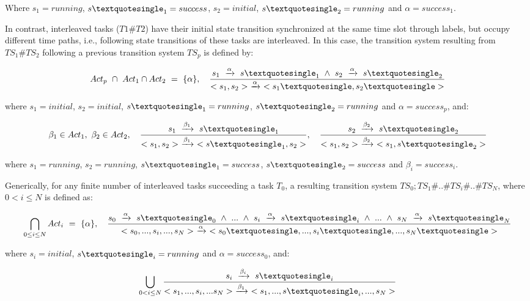 Where $s_1 = running$, $s\textquotesingle_1 = success$, $s_2 = initial$, $s\textquotesingle_2 = running$ and $\alpha = success_1$.


In contrast, interleaved tasks ($T1\#T2$) have their initial state transition synchronized at the same time slot through labels, but occupy different time paths, i.e., following state transitions of these tasks are interleaved. In this case, the transition system resulting from $TS_1\#TS_2$ following a previous transition system $TS_p$ is defined by:

$$Act_p\ \cap\ Act_1 \cap Act_2\ =\ \{\alpha\},\quad \frac{s_1\ \xrightarrow{\alpha}\ s\textquotesingle_1\ \wedge\ s_2\ \xrightarrow{\alpha}\ s\textquotesingle_2}{<s_1,s_2>\ \xrightarrow{\alpha}\ <s_1\textquotesingle, s_2\textquotesingle>}$$

\noindent
where $s_1 = initial$, $s_2 = initial$, $s\textquotesingle_1 = running$, $s\textquotesingle_2 = running$ and $\alpha = success_p$, and:

$$\beta_1 \in Act_1,\ \beta_2 \in Act_2,\quad \frac{s_1\ \xrightarrow{\beta_1}\ s\textquotesingle_1}{<s_1,s_2>\ \xrightarrow{\beta_1}\ <s\textquotesingle_1, s_2>},\quad \frac{s_2\ \xrightarrow{\beta_2}\ s\textquotesingle_2}{<s_1,s_2>\ \xrightarrow{\beta_2}\ <s_1, s\textquotesingle_2>}$$

\noindent
where $s_1 = running$, $s_2 = running$, $ s\textquotesingle_1 = success$, $s\textquotesingle_2 = success$ and $\beta_i = success_i$.
\bigskip

Generically, for any finite number of interleaved tasks succeeding a task $T_0$, a resulting transition system $TS_0;TS_1\#..\#TS_i\#..\#TS_N$, where $0 < i \leq N$ is defined as:

$$\bigcap_{0 \leq i \leq N} Act_i\ =\ \{\alpha\},\quad \frac{s_0\ \xrightarrow{\alpha}\ s\textquotesingle_0\ \wedge\ ...\ \wedge\ s_i\ \xrightarrow{\alpha}\ s\textquotesingle_i\ \wedge\ ...\ \wedge\ s_N\ \xrightarrow{\alpha}\ s\textquotesingle_N}{<s_0,...,s_i,...,s_N>\ \xrightarrow{\alpha}\ <s_0\textquotesingle, ...,s_i\textquotesingle,...,s_N\textquotesingle>}$$
\medskip

\noindent
where $s_i = initial$, $s\textquotesingle_i = running$ and $\alpha = success_0$, and:

$$\bigcup_{0 < i \leq N} \frac{s_i\ \xrightarrow{\beta_i}\ s\textquotesingle_i}{<s_1,...,s_i,...s_N>\ \xrightarrow{\beta_1}\ <s_1, ..., s\textquotesingle_i, ..., s_N>}$$
\medskip

